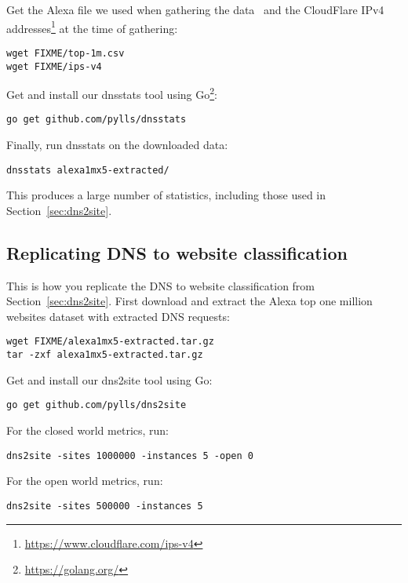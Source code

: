 Get the Alexa file we used when gathering the data~\cite{alexatop1k} and
the CloudFlare IPv4
addresses\footnote{\url{https://www.cloudflare.com/ips-v4}} at the time of
gathering:

\begin{lstlisting}
wget FIXME/top-1m.csv
wget FIXME/ips-v4
\end{lstlisting}

Get and install our dnsstats tool using Go\footnote{\url{https://golang.org/}}:

\begin{lstlisting}
go get github.com/pylls/dnsstats
\end{lstlisting}

Finally, run dnsstats on the downloaded data:

\begin{lstlisting}
dnsstats alexa1mx5-extracted/
\end{lstlisting}

This produces a large number of statistics, including those used in
 Section~\ref{sec:dns2site}.

\subsection{Replicating DNS to website classification}
This is how you replicate the DNS to website classification from
Section~\ref{sec:dns2site}.
First download and extract the Alexa top one
million websites dataset with extracted DNS requests:

\begin{lstlisting}
wget FIXME/alexa1mx5-extracted.tar.gz
tar -zxf alexa1mx5-extracted.tar.gz
\end{lstlisting}

Get and install our dns2site tool using Go:

\begin{lstlisting}
go get github.com/pylls/dns2site
\end{lstlisting}

For the closed world metrics, run:

\begin{lstlisting}
dns2site -sites 1000000 -instances 5 -open 0
\end{lstlisting}

For the open world metrics, run:

\begin{lstlisting}
dns2site -sites 500000 -instances 5
\end{lstlisting}

